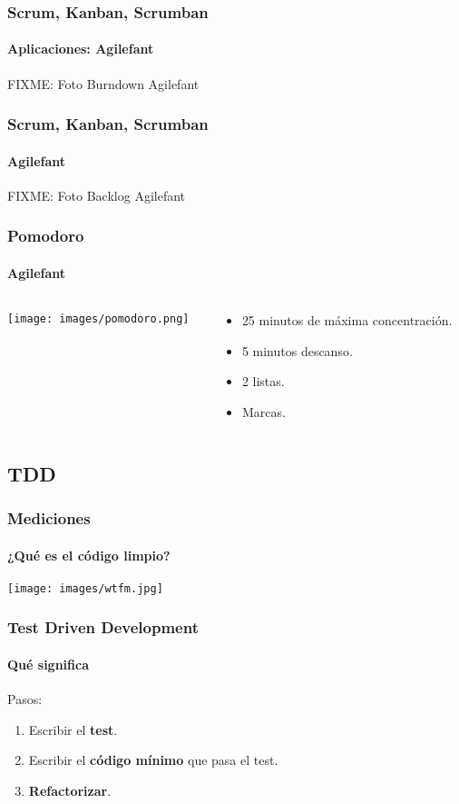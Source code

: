   \begin{frame}
   \frametitle{Scrum, Kanban, Scrumban}
   \framesubtitle{Aplicaciones: Agilefant}

   FIXME: Foto Burndown Agilefant

  \end{frame}

  \begin{frame}
   \frametitle{Scrum, Kanban, Scrumban}
   \framesubtitle{Agilefant}

   FIXME: Foto Backlog Agilefant

  \end{frame}

  \begin{frame}
   \frametitle{Pomodoro}
   \framesubtitle{Agilefant}

   \begin{columns}
    \begin{column}{4cm}
     \texttt{[image: images/pomodoro.png]}
    \end{column}
    \begin{column}{7cm}
     \begin{itemize}
      \item 25 minutos de máxima concentración.
      \item 5 minutos descanso.
      \item 2 listas.
      \item Marcas.
     \end{itemize}
    \end{column}
   \end{columns}
  \end{frame}

  \subsection{TDD}

  \begin{frame}
   \frametitle{Mediciones}
   \framesubtitle{¿Qué es el código limpio?}

   \begin{center}
    \texttt{[image: images/wtfm.jpg]}
   \end{center}
  \end{frame}



  \begin{frame}
   \frametitle{Test Driven Development}
   \framesubtitle{Qué significa}

   Pasos:
   \begin{enumerate}
    \item Escribir el \textbf{test}.
    \item Escribir el \textbf{código mínimo} que pasa el test.
    \item \textbf{Refactorizar}.
   \end{enumerate}
  \end{frame}


